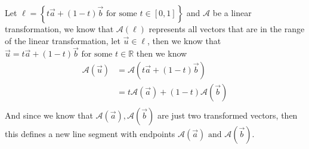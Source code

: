 \documentclass[11pt]{book}
\begin{document}
\begin{ex}
    Let $\ell = \left\{ t \vec{a} + \left( 1 - t \right) \vec{b} \text{ for some } t \in \left[ 0, 1 \right] \right\}$ and $\mathcal{A}$ be a linear transformation, we know that $\mathcal{A}\left(\ell\right)$ represents all vectors that are in the range of the linear transformation, let $\vec{u} \in \ell$,  then we know that $\vec{u} = t \vec{a} + \left( 1 - t \right)\vec{b} \text{ for some } t \in \mathbb{R}$ then we know 
    \begin{align*}
        \mathcal{A}\left(\vec{u}\right) &= \mathcal{A}\left(t \vec{a} + \left( 1 - t \right) \vec{b}\right)\\
                                        &= t\mathcal{A}\left(\vec{a}\right) + \left( 1 - t \right) \mathcal{A}\left(\vec{b}\right)\\
    \end{align*}
    And since we know that $\mathcal{A}\left(\vec{a}\right), \mathcal{A}\left(\vec{b}\right)$ are just two transformed vectors, then this defines a new line segment with endpoints $\mathcal{A}\left(\vec{a}\right) \text{  and  } \mathcal{A}\left(\vec{b}\right)$. 
\end{ex}
\end{document}
